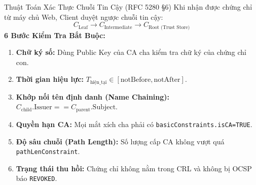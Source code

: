 \begin{frame}{Thuật Toán Xác Thực Chuỗi Tin Cậy (RFC 5280 §6)}
  Khi nhận được chứng chỉ từ máy chủ Web, Client duyệt ngược chuỗi tin cậy:
  $$C_{\text{Leaf}} \to C_{\text{Intermediate}} \to C_{\text{Root (Trust Store)}}$$
  \textbf{6 Bước Kiểm Tra Bắt Buộc:}
  \begin{enumerate}\small
    \item \textbf{Chữ ký số:} Dùng Public Key của CA cha kiểm tra chữ ký của chứng chỉ con.
    \item \textbf{Thời gian hiệu lực:} $T_{\text{hiện\_tại}} \in [\text{notBefore}, \text{notAfter}]$.
    \item \textbf{Khớp nối tên định danh (Name Chaining):}
      $C_{\text{child}}.\text{Issuer} == C_{\text{parent}}.\text{Subject}$.
    \item \textbf{Quyền hạn CA:} Mọi mắt xích cha phải có \texttt{basicConstraints.isCA=TRUE}.
    \item \textbf{Độ sâu chuỗi (Path Length):} Số lượng cấp CA không vượt quá \texttt{pathLenConstraint}.
    \item \textbf{Trạng thái thu hồi:} Chứng chỉ không nằm trong CRL và không bị OCSP báo \texttt{REVOKED}.
  \end{enumerate}
\end{frame}

